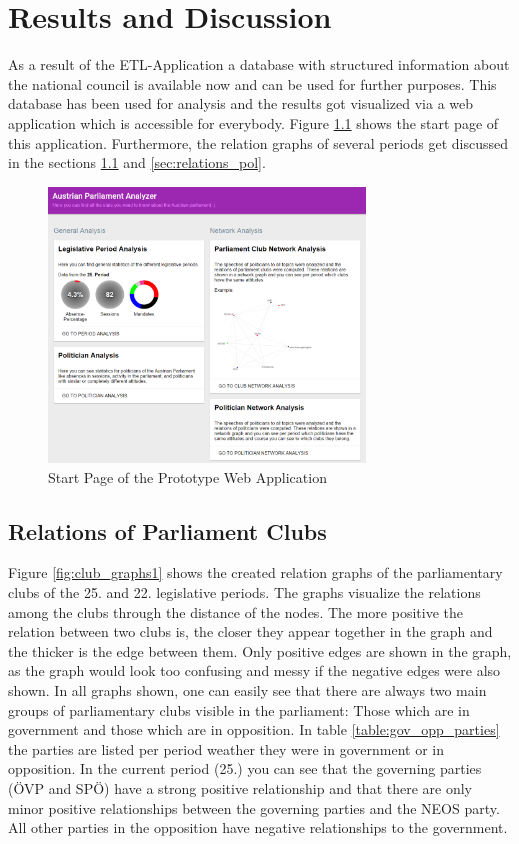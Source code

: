 \chapter{Results and Discussion}
\label{chap:evaluation}

As a result of the ETL-Application a database with structured information about the national council is available now and can be used for further purposes. This database has been used for analysis and the results got visualized via a web application which is accessible for everybody. Figure \ref{fig:start_page_prototype} shows the start page of this application. Furthermore, the relation graphs of several periods get discussed in the sections \ref{sec:relations_clubs} and \ref{sec:relations_pol}. 

\begin{figure}[h]
	\center
	\includegraphics[width=0.75\textwidth]{imgs/result_start_page}
	\caption{Start Page of the Prototype Web Application}
	\label{fig:start_page_prototype}
\end{figure}

\section{Relations of Parliament Clubs}
\label{sec:relations_clubs}
Figure \ref{fig:club_graphs1} shows the created relation graphs of the parliamentary clubs of the 25. and 22. legislative periods. The graphs visualize the relations among the clubs through the distance of the nodes. The more positive the relation between two clubs is, the closer they appear together in the graph and the thicker is the edge between them. Only positive edges are shown in the graph, as the graph would look too confusing and messy if the negative edges were also shown. In all graphs shown, one can easily see that there are always two main groups of parliamentary clubs visible in the parliament: Those which are in government and those which are in opposition. In table \ref{table:gov_opp_parties} the parties are listed per period weather they were in government or in opposition. 
In the current period (25.) you can see that the governing parties (ÖVP and SPÖ) have a strong positive relationship and that there are only minor positive relationships between the governing parties and the NEOS party. All other parties in the opposition have negative relationships to the government.

